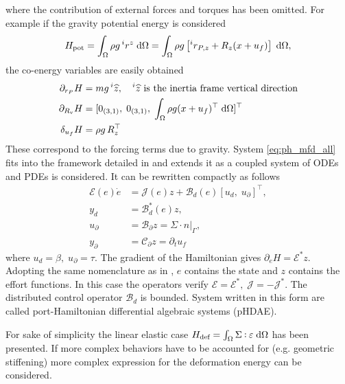 where the contribution of external forces and torques has been omitted. For example if the gravity potential energy is considered
\begin{equation*}
	H_{\text{pot}} = \int_{\Omega} \rho g \, ^i r^z \d{\Omega} = \int_{\Omega} \rho g \left[ ^i r_{P, z} +R_z (x + u_f) \right] \d{\Omega},
\end{equation*}
the co-energy variables are easily obtained
\begin{align*}
\partial_{r_P}H &= m g \, ^i \widehat{z}, \quad \text{$^i \widehat{z}$ is the inertia frame vertical direction}\\
\partial_{R_\text{v}}H &= [0_{(3, 1)}, \; 0_{(3, 1)}, \; \int_{\Omega} \rho g (x + u_f)^\top \d{\Omega}]^\top \\
\delta_{u_f} H &= \rho g \, R_z^\top
\end{align*}
These correspond to the forcing terms due to gravity. System \eqref{eq:ph_mfd_all} fits into the framework detailed in \cite{mehrmann2019structurepreserving} and extends it as a coupled system of ODEs and PDEs is considered. It can be rewritten compactly as follows
\begin{equation}
\label{eq:MFD_pHDAE}
\begin{aligned}
\mathcal{E}(e) \dot{e} &= \mathcal{J}(e) z + \mathcal{B}_d(e) [u_d, \; u_\partial]^\top, \\
y_d &= \mathcal{B}_d^*(e) z, \\
u_\partial &= \mathcal{B}_{\partial} z =  \Sigma \cdot n|_{\Gamma}, \\
y_\partial &= \mathcal{C}_{\partial} z = \partial_t u_f
\end{aligned}
\end{equation}
where $u_d = \beta, \; u_\partial = \tau$. The gradient of the Hamiltonian  gives $\partial_e H = \mathcal{E}^* z$. Adopting the same nomenclature as in \cite{mehrmann2019structurepreserving}, $e$ contains the state and $z$ contains the effort functions. In this case the operators verify $\mathcal{E} = \mathcal{E}^*, \; \mathcal{J} = -\mathcal{J}^*$. The distributed control operator $\mathcal{B}_d$ is bounded. System written in this form are called port-Hamiltonian differential algebraic systems (pHDAE). 

\begin{remark}
For sake of simplicity the linear elastic case $H_{\text{def}}=\int_{\Omega} \Sigma \cddot \varepsilon \d{\Omega}$ has been presented. If more complex behaviors have to be accounted for (e.g. geometric stiffening) more complex expression for the deformation energy can be considered.
\end{remark}

